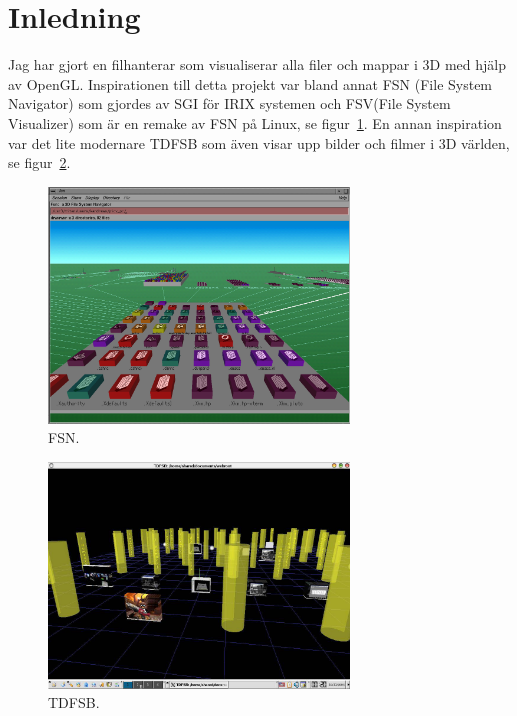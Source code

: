 \section{Inledning}
Jag har gjort en filhanterar som visualiserar alla filer och mappar i 3D med hjälp av OpenGL. Inspirationen till detta projekt var bland annat FSN (File System Navigator) som gjordes av SGI för IRIX systemen och FSV(File System Visualizer) som är en remake av FSN på Linux, se figur~\ref{fig:fsn}. En annan inspiration var det lite modernare TDFSB som även visar upp bilder och filmer i 3D världen, se figur~\ref{fig:tdfsb}. 

\begin{center}
\begin{figure}[H]
    \centering
\includegraphics[width=8cm]{../grafik/fsn1.png}
\caption{FSN.}
\label{fig:fsn}
\end{figure}
\end{center}

\begin{center}
\begin{figure}[H]
    \centering
\includegraphics[width=8cm]{../grafik/tdfsb.jpg}
\caption{TDFSB.}
\label{fig:tdfsb}
\end{figure}
\end{center}

